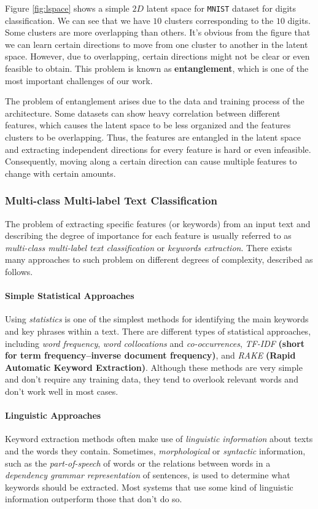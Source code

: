 Figure \ref{fig:lspace} shows a simple $2D$ latent space for \texttt{MNIST} dataset for digits classification. We can see that we have $10$ clusters corresponding to the $10$ digits. Some clusters are more overlapping than others. It's obvious from the figure that we can learn certain directions to move from one cluster to another in the latent space. However, due to overlapping, certain directions might not be clear or even feasible to obtain. This problem is known as \textbf{entanglement}, which is one of the most important challenges of our work.

The problem of entanglement arises due to the data and training process of the architecture. Some datasets can show heavy correlation between different features, which causes the latent space to be less organized and the features clusters to be overlapping. Thus, the features are entangled in the latent space and extracting independent directions for every feature is hard or even infeasible. Consequently, moving along a certain direction can cause multiple features to change with certain amounts.

\subsubsection{Multi-class Multi-label Text Classification}
The problem of extracting specific features (or keywords) from an input text and describing the degree of importance for each feature is usually referred to as \emph{multi-class multi-label text classification} or \emph{keywords extraction}. There exists many approaches to such problem on different degrees of complexity, described as follows.

\paragraph{Simple Statistical Approaches}
Using \emph{statistics} is one of the simplest methods for identifying the main keywords and key phrases within a text. There are different types of statistical approaches, including \emph{word frequency}, \emph{word collocations} and \emph{co-occurrences}, \emph{TF-IDF} \textbf{(short for term frequency–inverse document frequency)}, and \emph{RAKE} \textbf{(Rapid Automatic Keyword Extraction)}. Although these methods are very simple and don't require any training data, they tend to overlook relevant words and don't work well in most cases.

\paragraph{Linguistic Approaches}
Keyword extraction methods often make use of \emph{linguistic information} about texts and the words they contain. Sometimes, \emph{morphological} or \emph{syntactic} information, such as the \emph{part-of-speech} of words or the relations between words in a \emph{dependency grammar representation} of sentences, is used to determine what keywords should be extracted. Most systems that use some kind of linguistic information outperform those that don’t do so.

